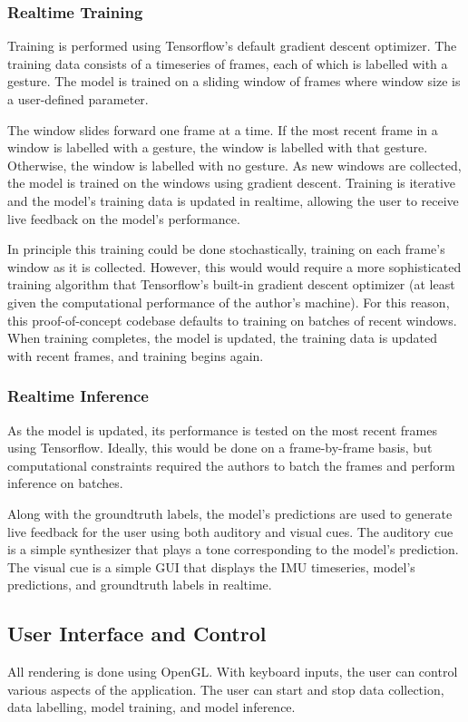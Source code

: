 \documentclass{article}
\begin{document}
\subsubsection{Realtime Training}
Training is performed using Tensorflow's default gradient descent optimizer. The training data consists of a timeseries of frames, each of which is labelled with a gesture. The model is trained on a sliding window of frames where window size is a user-defined parameter.

The window slides forward one frame at a time. If the most recent frame in a window is labelled with a gesture, the window is labelled with that gesture. Otherwise, the window is labelled with no gesture. As new windows are collected, the model is trained on the windows using gradient descent. Training is iterative and the model's training data is updated in realtime, allowing the user to receive live feedback on the model's performance.

In principle this training could be done stochastically, training on each frame's window as it is collected. However, this would  would require a more sophisticated training algorithm that Tensorflow's built-in gradient descent optimizer (at least given the computational performance of the author's machine). For this reason, this proof-of-concept codebase defaults to training on batches of recent windows. When training completes, the model is updated, the training data is updated with recent frames, and training begins again.

\subsubsection{Realtime Inference}
As the model is updated, its performance is tested on the most recent frames using Tensorflow. Ideally, this would be done on a frame-by-frame basis, but computational constraints required the authors to batch the frames and perform inference on batches.

Along with the groundtruth labels, the model's predictions are used to generate live feedback for the user using both auditory and visual cues. The auditory cue is a simple synthesizer that plays a tone corresponding to the model's prediction. The visual cue is a simple GUI that displays the IMU timeseries, model's predictions, and groundtruth labels in realtime.

\subsection{User Interface and Control}
All rendering is done using OpenGL. With keyboard inputs, the user can control various aspects of the application. The user can start and stop data collection, data labelling, model training, and model inference.
\end{document}
